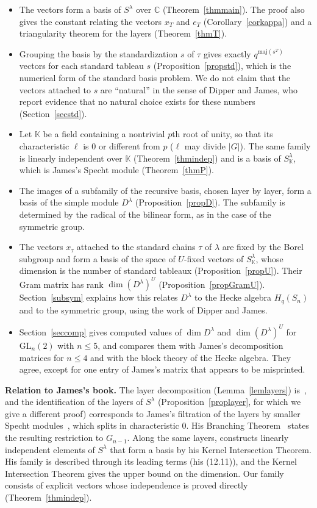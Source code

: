 \documentclass[11pt, letterpaper]{amsart}
\theoremstyle{definition}
\theoremstyle{remark}
\newcommand{\KK}{\mathbb{K}}
\newcommand{\CC}{\mathbb{C}}
\newcommand{\GL}{\mathrm{GL}}
\newcommand{\maj}{\mathrm{maj}}
\begin{document}
\begin{itemize}
\item The vectors form a basis of $S^\lambda$ over $\CC$ (Theorem~\ref{thmmain}). The proof also gives the constant relating the vectors $x_T$ and $e_T$ (Corollary~\ref{corkappa}) and a triangularity theorem for the layers (Theorem~\ref{thmT}).
\item Grouping the basis by the standardization $s$ of $\tau$ gives exactly $q^{\maj(s^T)}$ vectors for each standard tableau $s$ (Proposition~\ref{propstd}), which is the numerical form of the standard basis problem. We do not claim that the vectors attached to $s$ are ``natural'' in the sense of Dipper and James, who report evidence that no natural choice exists for these numbers (Section~\ref{secstd}).
\item Let $\KK$ be a field containing a nontrivial $p$th root of unity, so that its characteristic $\ell$ is $0$ or different from $p$ ($\ell$ may divide $|G|$). The same family is linearly independent over $\KK$ (Theorem~\ref{thmindep}) and is a basis of $S^\lambda_\KK$, which is James's Specht module (Theorem~\ref{thmP}).
\item The images of a subfamily of the recursive basis, chosen layer by layer, form a basis of the simple module $D^\lambda$ (Proposition~\ref{propD}). The subfamily is determined by the radical of the bilinear form, as in the case of the symmetric group.
\item The vectors $x_\tau$ attached to the standard chains $\tau$ of $\lambda$ are fixed by the Borel subgroup and form a basis of the space of $U$-fixed vectors of $S^\lambda_\KK$, whose dimension is the number of standard tableaux (Proposition~\ref{propU}). Their Gram matrix has rank $\dim(D^\lambda)^U$ (Proposition~\ref{propGramU}). Section~\ref{subsym} explains how this relates $D^\lambda$ to the Hecke algebra $H_q(S_n)$ and to the symmetric group, using the work of Dipper and James.
\item Section~\ref{seccomp} gives computed values of $\dim D^\lambda$ and $\dim(D^\lambda)^U$ for $\GL_n(2)$ with $n\le5$, and compares them with James's decomposition matrices for $n\le4$ and with the block theory of the Hecke algebra. They agree, except for one entry of James's matrix that appears to be misprinted.
\end{itemize}

\medskip
\noindent\textbf{Relation to James's book.} The layer decomposition (Lemma~\ref{lemlayers}) is~\cite[Thm.~9.11]{James84}, and the identification of the layers of $S^\lambda$ (Proposition~\ref{proplayer}, for which we give a different proof) corresponds to James's filtration of the layers by smaller Specht modules~\cite[Thm.~16.9]{James84}, which splits in characteristic $0$. His Branching Theorem~\cite[Thm.~16.10]{James84} states the resulting restriction to $G_{n-1}$. Along the same layers, \cite[Ch.~12 (p.~73), Thm.~16.9]{James84} constructs linearly independent elements of $S^\lambda$ that form a basis by his Kernel Intersection Theorem. His family is described through its leading terms (his (12.11)), and the Kernel Intersection Theorem gives the upper bound on the dimension. Our family consists of explicit vectors whose independence is proved directly (Theorem~\ref{thmindep}).
\end{document}
